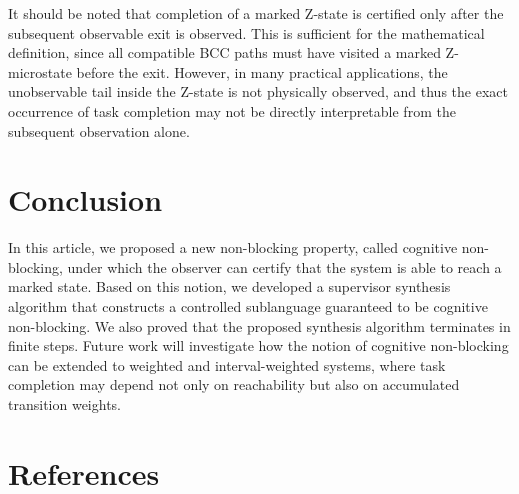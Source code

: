 \documentclass[journal,twoside,web]{ieeecolor}
\begin{document}
It should be noted that completion of a marked Z-state is certified only after the subsequent observable exit is observed. 
This is sufficient for the mathematical definition, since all compatible BCC paths must have visited a marked Z-microstate before the exit. 
However, in many practical applications, the unobservable tail inside the Z-state is not physically observed, and thus the exact occurrence of task completion may not be directly interpretable from the subsequent observation alone.

\section{Conclusion}\label{sec:con}

In this article, we proposed a new non-blocking property, called cognitive non-blocking, under which the observer can certify that the system is able to reach a marked state. 
Based on this notion, we developed a supervisor synthesis algorithm that constructs a controlled sublanguage guaranteed to be cognitive non-blocking. 
We also proved that the proposed synthesis algorithm terminates in finite steps. 
%
Future work will investigate how the notion of cognitive non-blocking can be extended to weighted and interval-weighted systems, where task completion may depend not only on reachability but also on accumulated transition weights.

\section*{References}\vspace{-1em}


\end{document}
